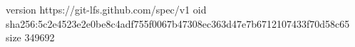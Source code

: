version https://git-lfs.github.com/spec/v1
oid sha256:5c2e4523e2e0be8c4adf755f0067b47308ec363d47e7b6712107433f70d58c65
size 349692
